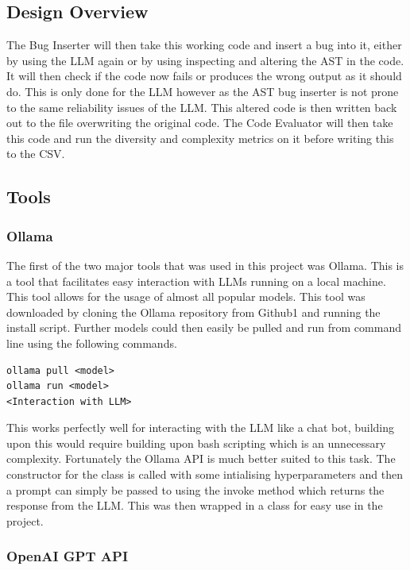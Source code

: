 \documentclass[12pt]{extarticle}
\begin{document}
\subsection{Design Overview}

The Bug Inserter will then take this working code and insert a bug into it, either by using the LLM again or by using inspecting and altering the AST in the code. It will then check if the code now fails or produces the wrong output as it should do. This is only done for the LLM however as the AST bug inserter is not prone to the same reliability issues of the LLM. This altered code is then written back out to the file overwriting the original code. The Code Evaluator will then take this code and run the diversity and complexity metrics on it before writing this to the CSV.

\subsection{Tools}
\subsubsection{Ollama}

The first of the two major tools that was used in this project was Ollama. This is a tool that facilitates easy interaction with LLMs running on a local machine. This tool allows for the usage of almost all popular models. This tool was downloaded by cloning the Ollama repository from Github1 and running the install script. Further models could then easily be pulled and run from command line using the following commands.

\begin{verbatim}
ollama pull <model>
ollama run <model>
<Interaction with LLM>
\end{verbatim}

This works perfectly well for interacting with the LLM like a chat bot, building upon this would require building upon bash scripting which is an unnecessary complexity. Fortunately the Ollama API is much better suited to this task. The constructor for the class is called with some intialising hyperparameters and then a prompt can simply be passed to using the invoke method which returns the response from the LLM. This was then wrapped in a class for easy use in the project.

\subsubsection{OpenAI GPT API}
\end{document}
